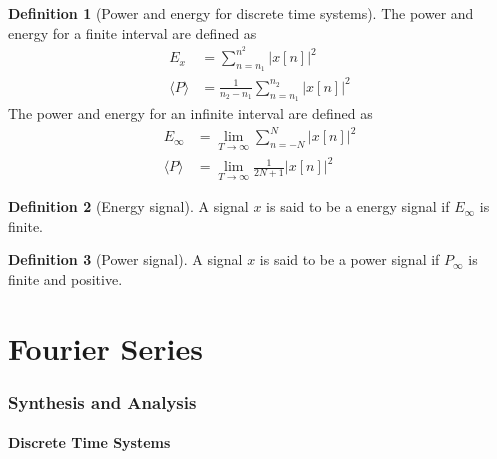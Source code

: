 \documentclass[titlepage, fleqn, a4paper, 12pt, twoside]{article}
\theoremstyle{definition}
\newtheorem{definition}{Definition}
\theoremstyle{theorem}
\begin{document}
\begin{definition}[Power and energy for discrete time systems]
	The power and energy for a finite interval are defined as
	\begin{align*}
		E_x &= \sum\limits_{n = n_1}^{n^2} \left| x[n] \right|^2\\
		\langle P \rangle &= \frac{1}{n_2 - n_1} \sum\limits_{n = n_1}^{n_2} \left| x[n] \right|^2
	\end{align*}
	The power and energy for an infinite interval are defined as
	\begin{align*}
		E_{\infty} &= \lim\limits_{T \to \infty} \sum\limits_{n = -N}^{N} \left| x[n] \right|^2\\
		\langle P \rangle &= \lim\limits_{T \to \infty} \frac{1}{2 N + 1} \left| x[n] \right|^2
	\end{align*}
\end{definition}

\begin{definition}[Energy signal]
	A signal $x$ is said to be a energy signal if $E_{\infty}$ is finite.
\end{definition}

\begin{definition}[Power signal]
	A signal $x$ is said to be a power signal if $P_{\infty}$ is finite and positive.
\end{definition}

\clearpage
\part{Fourier Series}

\section{Synthesis and Analysis}

\subsection{Discrete Time Systems}
\end{document}
